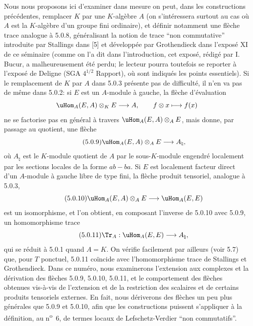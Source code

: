 Nous nous proposons ici d'examiner dans  mesure on peut, dans les constructions précédentes, remplacer $K$ par une $K$-algèbre $A$ (on s'intéressera surtout au cas où $A$ est la $K$-algèbre d'un groupe fini ordinaire), et définir notamment une flèche trace analogue à 5.0.8, généralisant la notion de trace ``non commutative'' introduite par Stallings dans [5] et développée par Grothendieck dans l'exposé XI de ce séminaire (comme on l'a dit dans l'introduction, cet exposé, rédigé par I. Bucur, a malheureusement été perdu; le lecteur pourra toutefois se reporter à l'exposé de Deligne (SGA $4^{1/2}$ Rapport), où sont indiqués les points essentiels). Si le remplacement de $K$ par $A$ dans 5.0.3  présente pas de difficulté, il n'en va pas de même dans 5.0.2: si $E$ est un $A$-module à gauche, la flèche d'évaluation
\[
\uHom_A(E,A)\otimes_KE\longrightarrow A,
\qquad f\otimes x\longmapsto f(x)
\]
ne se factorise pas en général à travers $\uHom_A(E,A)\otimes_AE$, mais donne, par passage au quotient, une flèche
\begin{equation}\tag{5.0.9}
\uHom_A(E,A)\otimes_AE\longrightarrow A_\natural,
\end{equation}
où $A_\natural$ est le $K$-module quotient de $A$ par le sous-$K$-module engendré localement par les sections locales de la forme $ab-ba$. Si $E$ est localement facteur direct d'un $A$-module à gauche libre de type fini, la flèche produit tensoriel, analogue à 5.0.3,
\begin{equation}\tag{5.0.10}
\uHom_A(E,A)\otimes_AE\longrightarrow\uHom_A(E,E)
\end{equation}
est un isomorphisme, et l'on obtient, en composant l'inverse de 5.0.10 avec 5.0.9, un homomorphisme trace
\begin{equation}\tag{5.0.11}
\Tr_A:\uHom_A(E,E)\longrightarrow A_\natural,
\end{equation}
qui se réduit à 5.0.1 quand $A=K$. On vérifie facilement par ailleurs (voir 5.7) que, pour $T$ ponctuel, 5.0.11 coïncide avec l'homomorphisme trace de Stallings et Grothendieck. Dans ce numéro, nous examinerons l'extension aux complexes et la dérivation des flèches 5.0.9, 5.0.10, 5.0.11, et le comportement des flèches obtenues vis-à-vis de l'extension et de la restriction des scalaires et de certains produits tensoriels externes. En fait, nous dériverons des flèches un peu plus générales que 5.0.9 et 5.0.10, afin que les constructions puissent s'appliquer à la définition, au n\textsuperscript{o}~6, de termes locaux de Lefschetz-Verdier ``non commutatifs''.


